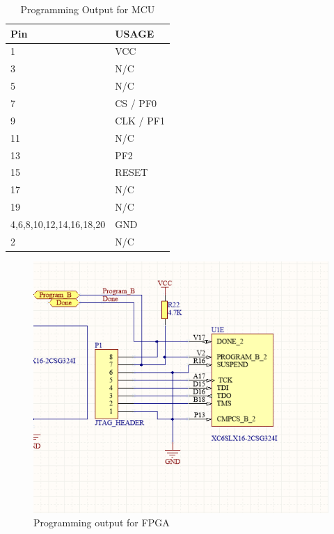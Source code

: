 \begin{table}[]
    \centering
    \begin{tabular}{ll}
        Pin                     & USAGE     \\
        \hline
        1                       & VCC       \\
        3                       & N/C       \\
        5                       & N/C       \\
        7                       & CS / PF0  \\
        9                       & CLK / PF1 \\
        11                      & N/C       \\
        13                      & PF2       \\
        15                      & RESET     \\
        17                      & N/C       \\
        19                      & N/C       \\
        4,6,8,10,12,14,16,18,20 & GND       \\
        2                       & N/C
    \end{tabular}
    \caption{Programming Output for MCU}
    \label{tab:EfmProgrammer}
\end{table}

\begin{figure}
    \includegraphics[width=\linewidth]{img/FPGA_Programmer}
    \caption{Programming output for FPGA}
    \label{fig:FpgaProgrammer}
\end{figure}

